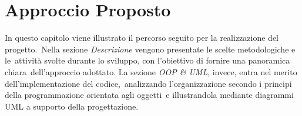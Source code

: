 \chapter{Approccio Proposto}

In questo capitolo viene illustrato il percorso seguito per la realizzazione del progetto.\
Nella sezione \textit{Descrizione} vengono presentate le scelte metodologiche e le\
attività svolte durante lo sviluppo, con l'obiettivo di fornire una panoramica chiara\
dell'approccio adottato. La sezione \textit{OOP \& UML}, invece, entra nel merito dell'implementazione del codice,\
analizzando l'organizzazione secondo i principi della programmazione orientata agli oggetti\
e illustrandola mediante diagrammi UML a supporto della progettazione.


